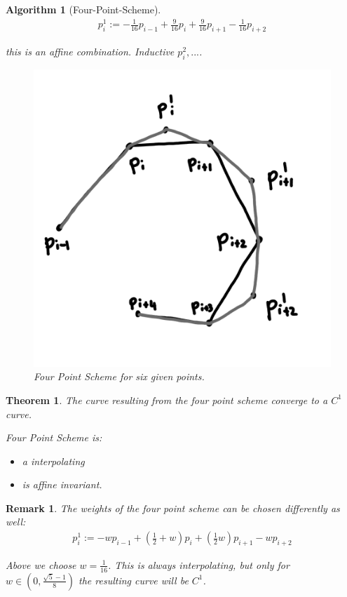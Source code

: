 \documentclass[]{article}
\newtheorem{theorem}{Theorem}
\newtheorem{algorithm}{Algorithm}
\newtheorem{remark}{Remark}
\begin{document}
\begin{algorithm}[Four-Point-Scheme]
	\begin{align*}
		p_i^1 := -\frac{1}{16} p_{i-1} + \frac{9}{16} p_i + \frac{9}{16} p_{i+1} - \frac{1}{16} p_{i+2}
	\end{align*}
	
	this is an affine combination. Inductive $p_i^2, ...$.
	
	\begin{figure}[h!]
		\centering
		\includegraphics[width=0.3\linewidth]{figures/four_point_scheme}
		\caption{Four Point Scheme for six given points.}
		\label{fig:four_point_scheme}
	\end{figure}
\end{algorithm}

\begin{theorem}
	The curve resulting from the four point scheme converge to a $C^1$ curve.
	
	Four Point Scheme is:
	\begin{itemize}
		\item a interpolating
		\item is affine invariant.
	\end{itemize}
\end{theorem}

\begin{remark}
	The weights of the four point scheme can be chosen differently as well:
	\begin{align*}
		p_i^1 := -w p_{i-1} + (\frac{1}{2} + w) p_i + (\frac{1}{2} w) p_{i+1} - w p_{i+2}
	\end{align*}
	
	Above we choose $w=\frac{1}{16}$. This is always interpolating, but only for $w \in (0, \frac{\sqrt{5} - 1}{8})$ the resulting curve will be $C^1$.
\end{remark}
\end{document}
